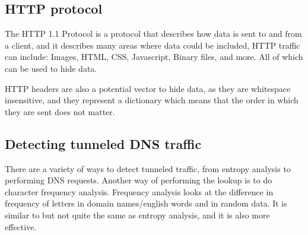 \subsection{HTTP protocol}
The HTTP 1.1 Protocol\cite{rfc2616} is a protocol that describes how data is sent to and from a client, and it describes many areas where data could be included, HTTP traffic can include:
Images,
HTML,
CSS,
Javascript,
Binary files,
and more.
All of which can be used to hide data.\par
HTTP headers are also a potential vector to hide data, as they are whitespace insensitive, and they represent a dictionary which means that the order in which they are sent does not matter\cite{rfc2616}.

\subsection{Detecting tunneled DNS traffic}
There are a variety of ways to detect tunneled traffic, from entropy analysis to performing DNS requests\cite{detectingdns}.
Another way of performing the lookup is to do character frequency analysis\cite{freqanal}.
Frequency analysis looks at the difference in frequency of letters in domain names/english words and in random data. It is similar to but not quite the same as entropy analysis, and it is also more effective\cite{freqanal}.
